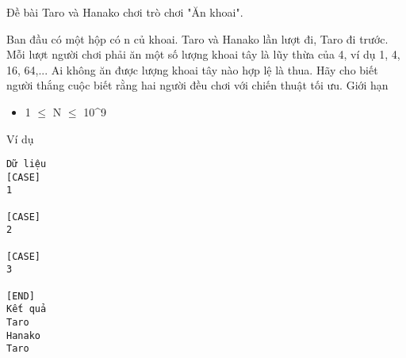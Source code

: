 Đề bài
Taro và Hanako chơi trò chơi "Ăn khoai".  

   Ban đầu có một hộp có n củ khoai. Taro và Hanako lần lượt đi, Taro đi trước. Mỗi lượt người chơi phải ăn một số lượng khoai tây là lũy thừa của 4, ví dụ 1, 4, 16, 64,... Ai không ăn được lượng khoai tây nào hợp lệ là thua. Hãy cho biết người thắng cuộc biết rằng hai người đều chơi với chiến thuật tối ưu.
Giới hạn
\begin{itemize}
	\item     1  $\le$  N  $\le$  10^9   
\end{itemize}
Ví dụ
\begin{verbatim}
Dữ liệu
[CASE]
1

[CASE]
2

[CASE]
3

[END]
Kết quả
Taro
Hanako
Taro
\end{verbatim}